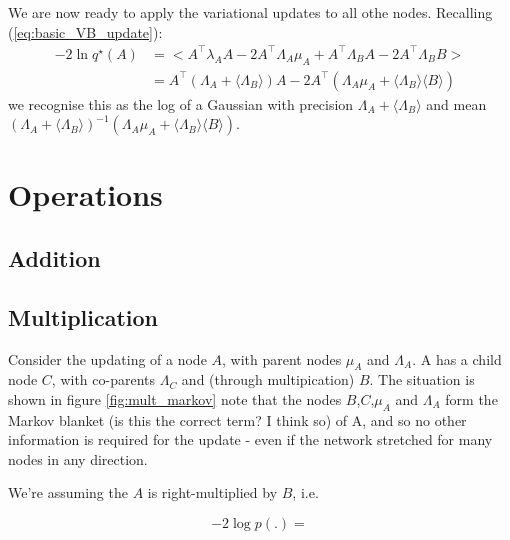 \documentclass{article}
\newcommand{\qs}{q^\star}
\newcommand{\<}{\langle}
\renewcommand{\>}{\rangle}
\begin{document}
We are now ready to apply the variational updates to all othe nodes. Recalling (\ref{eq:basic_VB_update}):
\begin{equation}
\begin{split}
-2 \ln \qs (A) &= \big< A^\top\lambda_A A -2A^\top\Lambda_A\mu_A + A^\top\Lambda_B A  - 2A^\top \Lambda_B B \big>\\
 &= A^\top(\Lambda_A + \<\Lambda_B\>)A -2A^\top(\Lambda_A\mu_A + \<\Lambda_B\> \<B\>)
\end{split}
\end{equation}
we recognise this as the log of a Gaussian with precision $\Lambda_A + \<\Lambda_B\>$ and mean $(\Lambda_A + \<\Lambda_B\>)^{-1}(\Lambda_A\mu_A + \<\Lambda_B\> \<B\>)$.  



\section{Operations}
\subsection{Addition}
\subsection{Multiplication}
Consider the updating of a node $A$, with parent nodes $\mu_A$ and $\Lambda_A$.  A has a child node $C$, with co-parents $\Lambda_C$ and (through multipication) $B$.  The situation is shown in figure \ref{fig:mult_markov}
note that the nodes $B$,$C$,$\mu_A$ and $\Lambda_A$ form the Markov blanket (is this the correct term? I think so) of A, and so no other information is required for the update - even if the network stretched for many nodes in any direction.  

We're assuming the $A$ is right-multiplied by $B$, i.e. %

\begin{equation}
-2 \log p(.) = 
\end{equation}
\end{document}
